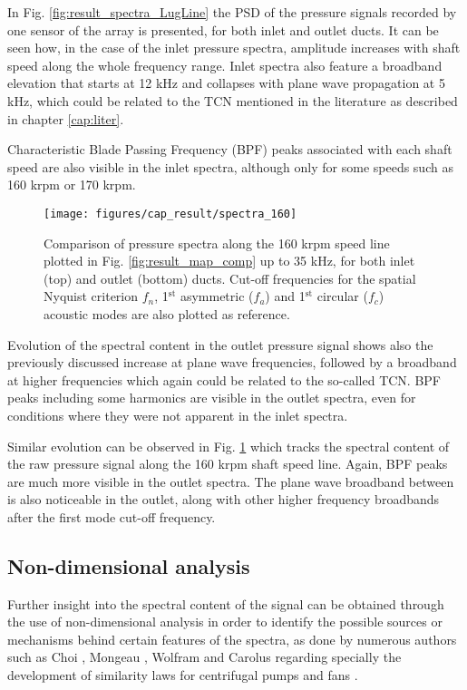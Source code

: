 In Fig. \ref{fig:result_spectra_LugLine} the PSD of the pressure signals recorded by one sensor of the array is presented, for both inlet and outlet ducts. It can be seen how, in the case of the inlet pressure spectra, amplitude increases with shaft speed along the whole frequency range. Inlet spectra also feature a broadband  elevation that starts at 12 kHz and collapses with plane wave propagation at 5 kHz, which could be related to the TCN mentioned in the literature as described in chapter \ref{cap:liter}.

Characteristic Blade Passing Frequency (BPF) peaks associated with each shaft speed are also visible in the inlet spectra, although only for some speeds such as 160 krpm or 170 krpm.

\begin{figure}[tbh!]
\centering
\texttt{[image: figures/cap\_result/spectra\_160]}
\caption{Comparison of pressure spectra along the 160 krpm speed line plotted in Fig. \ref{fig:result_map_comp} up to 35 kHz, for both inlet (top) and outlet (bottom) ducts. Cut-off frequencies for the spatial Nyquist criterion $f_n$, 1${}^\text{st}$ asymmetric ($f_a$) and 1${}^\text{st}$ circular ($f_c$) acoustic modes are also plotted as reference.}
\label{fig:result_spectra_160}
\end{figure}

Evolution of the spectral content in the outlet pressure signal shows also the previously discussed increase at plane wave frequencies, followed by a broadband at higher frequencies which again could be related to the so-called TCN. BPF peaks including some harmonics are visible in the outlet spectra, even for conditions where they were not apparent in the inlet spectra.

Similar evolution can be observed in Fig. \ref{fig:result_spectra_160} which tracks the spectral content of the raw pressure signal along the 160 krpm shaft speed line. Again, BPF peaks are much more visible in the outlet spectra. The plane wave broadband between is also noticeable in the outlet, along with other higher frequency broadbands after the first mode cut-off frequency.

\subsection{Non-dimensional analysis}

Further insight into the spectral content of the signal can be obtained through the use of non-dimensional analysis in order to identify the possible sources or mechanisms behind certain features of the spectra, as done by numerous authors such as Choi \cite{choi1994aerodynamic,choi2003experiments}, Mongeau \cite{mongeau1993sound,mongeau1995method}, Wolfram \cite{wolfram2009detection,wolfram2010experimental} and Carolus \cite{carolus2000experimental} regarding specially the development of similarity laws for centrifugal pumps and fans \cite{neise1982acoustic}.

